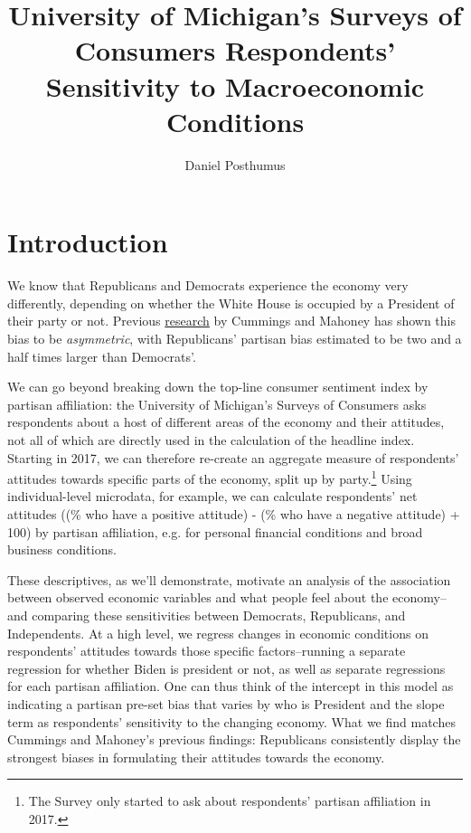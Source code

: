 \documentclass{article}
\title{University of Michigan's Surveys of Consumers Respondents' Sensitivity to Macroeconomic Conditions}
\author{Daniel Posthumus}
\begin{document}
\maketitle

\section{Introduction}

We know that Republicans and Democrats experience the economy very differently, depending on whether the White House is occupied by a President of their party or not. Previous \href{https://www.briefingbook.info/p/asymmetric-amplification-and-the}{research} by Cummings and Mahoney has shown this bias to be \textit{asymmetric}, with Republicans' partisan bias estimated to be two and a half times larger than Democrats'.

We can go beyond breaking down the top-line consumer sentiment index by partisan affiliation: the University of Michigan's Surveys of Consumers asks respondents about a host of different areas of the economy and their attitudes, not all of which are directly used in the calculation of the headline index. Starting in 2017, we can therefore re-create an aggregate measure of respondents' attitudes towards specific parts of the economy, split up by party.\footnote{The Survey only started to ask about respondents' partisan affiliation in 2017.} Using individual-level microdata, for example, we can calculate respondents' net attitudes ((\% who have a positive attitude) - (\% who have a negative attitude) + 100) by partisan affiliation, e.g. for personal financial conditions and broad business conditions. 

These descriptives, as we'll demonstrate, motivate an analysis of the association between observed economic variables and what people feel about the economy--and comparing these sensitivities between Democrats, Republicans, and Independents. At a high level, we regress changes in economic conditions on respondents' attitudes towards those specific factors--running a separate regression for whether Biden is president or not, as well as separate regressions for each partisan affiliation. One can thus think of the intercept in this model as indicating a partisan pre-set bias that varies by who is President and the slope term as respondents' sensitivity to the changing economy. What we find matches Cummings and Mahoney's previous findings: Republicans consistently display the strongest biases in formulating their attitudes towards the economy. 
\end{document}
